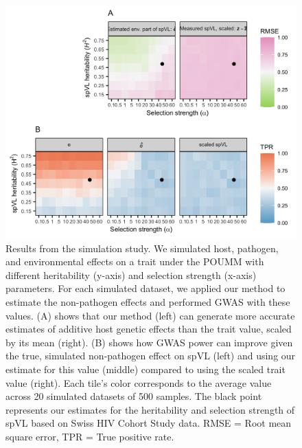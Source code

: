 \documentclass[11pt]{article}
\begin{document}
\begin{linenumbers}

\begin{figure}[H]
	\begin{center}
		\includegraphics[width=\linewidth]{figures/simulation_results}
		\caption{Results from the simulation study. We simulated host, pathogen, and environmental effects on a trait under the POUMM with different heritability (y-axis) and selection strength (x-axis) parameters. For each simulated dataset, we applied our method to estimate the non-pathogen effects and performed GWAS with these values. (A) shows that our method (left) can generate more accurate estimates of additive host genetic effects than the trait value, scaled by its mean (right). (B) shows how GWAS power can improve given the true, simulated non-pathogen effect on spVL (left) and using our estimate for this value (middle) compared to using the scaled trait value (right). Each tile's color corresponds to the average value across 20 simulated datasets of 500 samples. The black point represents our estimates for the heritability and selection strength of spVL based on Swiss HIV Cohort Study data. RMSE = Root mean square error, TPR = True positive rate.}
		\label{fig:simulationResults}
	\end{center}
\end{figure}


\end{linenumbers}
\end{document}
